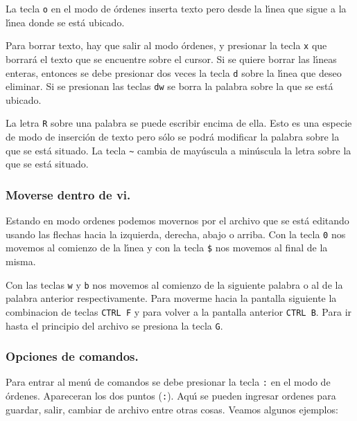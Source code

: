 La tecla \verb+o+ en el modo de {\'o}rdenes inserta texto pero desde la
l{\'\i}nea que sigue a la l{\'\i}nea donde se est{\'a} ubicado.

Para borrar texto, hay que salir al modo {\'o}rdenes, y presionar la tecla
\verb+x+ que borrar{\'a} el texto que se encuentre sobre el cursor. Si se
quiere borrar las l{\'\i}neas enteras, entonces se debe presionar dos veces la
tecla \verb+d+ sobre la l{\'\i}nea que deseo eliminar. Si se presionan las teclas
\verb+dw+ se borra la palabra sobre la que se est{\'a} ubicado.

La letra \verb+R+ sobre una palabra se puede escribir encima de
ella. Esto es una especie de modo de inserci{\'o}n de texto pero s{\'o}lo
se podr{\'a} modificar la palabra sobre la que se est{\'a} situado. La tecla
\verb+~+ cambia de may{\'u}scula a min{\'u}scula la letra sobre la que se est{\'a}
situado.


\subsubsection{Moverse dentro de vi.}

Estando en modo ordenes podemos movernos por el archivo que se est{\'a}
editando usando las flechas hacia la izquierda, derecha, abajo o
arriba.  Con la tecla \verb+0+ nos movemos al comienzo de la l{\'\i}nea y
con la tecla {\tt \$} nos movemos al final de la misma.  

Con las teclas \verb+w+ y \verb+b+ nos movemos al comienzo de la
siguiente palabra o al de la palabra anterior respectivamente.  Para
moverme hacia la pantalla siguiente la combinacion de teclas
\verb+CTRL F+ y para volver a la pantalla anterior \verb+CTRL B+.
Para ir hasta el principio del archivo se presiona la tecla \verb+G+.


\subsubsection{Opciones de comandos.}

Para entrar al men{\'u} de comandos se debe presionar la tecla \verb+:+ en
el modo de {\'o}rdenes. Apareceran los dos puntos (\verb+:+). 
Aqu{\'\i} se pueden
ingresar ordenes para guardar, salir, cambiar de archivo entre otras cosas.
Veamos algunos ejemplos:


